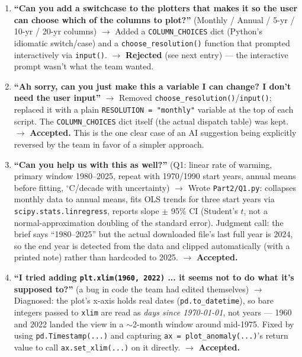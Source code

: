 \begin{enumerate}[leftmargin=*, itemsep=0.8em]
\item \textbf{``Can you add a switchcase to the plotters that makes it so the user can
choose which of the columns to plot?''} (Monthly / Annual / 5-yr / 10-yr / 20-yr columns)
$\rightarrow$ Added a \texttt{COLUMN\_CHOICES} dict (Python's idiomatic switch/case) and a
\texttt{choose\_resolution()} function that prompted interactively via \texttt{input()}.
$\rightarrow$ \textbf{Rejected} (see next entry) --- the interactive prompt wasn't what the
team wanted.

\item \textbf{``Ah sorry, can you just make this a variable I can change? I don't need the
user input''}
$\rightarrow$ Removed \texttt{choose\_resolution()}/\texttt{input()}; replaced it with a
plain \texttt{RESOLUTION = "monthly"} variable at the top of each script. The
\texttt{COLUMN\_CHOICES} dict itself (the actual dispatch table) was kept.
$\rightarrow$ \textbf{Accepted.} This is the one clear case of an AI suggestion being
explicitly reversed by the team in favor of a simpler approach.

\item \textbf{``Can you help us with this as well?''} (Q1: linear rate of warming, primary
window 1980--2025, repeat with 1970/1990 start years, annual means before fitting,
$^\circ$C/decade with uncertainty)
$\rightarrow$ Wrote \texttt{Part2/Q1.py}: collapses monthly data to annual means, fits OLS
trends for three start years via \texttt{scipy.stats.linregress}, reports slope $\pm$ 95\%
CI (Student's $t$, not a normal-approximation doubling of the standard error). Judgment
call: the brief says ``1980--2025'' but the actual downloaded file's last full year is 2024,
so the end year is detected from the data and clipped automatically (with a printed note)
rather than hardcoded to 2025.
$\rightarrow$ \textbf{Accepted.}

\item \textbf{``I tried adding \texttt{plt.xlim(1960, 2022)} ... it seems not to do what
it's supposed to?''} (a bug in code the team had edited themselves)
$\rightarrow$ Diagnosed: the plot's x-axis holds real dates (\texttt{pd.to\_datetime}), so
bare integers passed to \texttt{xlim} are read as \emph{days since 1970-01-01}, not years ---
1960 and 2022 landed the view in a $\sim$2-month window around mid-1975. Fixed by using
\texttt{pd.Timestamp(...)} and capturing \texttt{ax = plot\_anomaly(...)}'s return value to
call \texttt{ax.set\_xlim(...)} on it directly.
$\rightarrow$ \textbf{Accepted.}


\end{enumerate}
